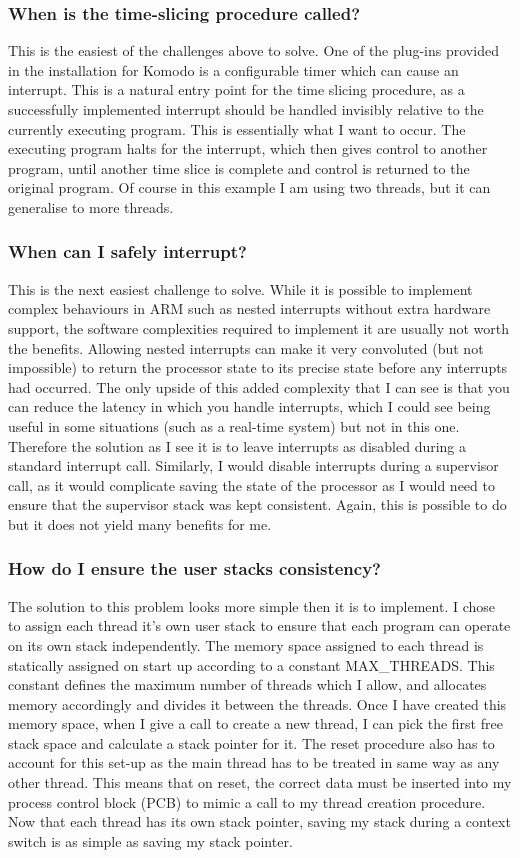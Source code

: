 \subsubsection{When is the time-slicing procedure called?}
This is the easiest of the challenges above to solve. One of the plug-ins provided in the installation for Komodo is a configurable timer which can cause an interrupt. This is a natural entry point for the time slicing procedure, as a successfully implemented interrupt should be handled invisibly relative to the currently executing program. This is essentially what I want to occur. The executing program halts for the interrupt, which then gives control to another program, until another time slice is complete and control is returned to the original program. Of course in this example I am using two threads, but it can generalise to more threads. 
\subsubsection{When can I safely interrupt?}
This is the next easiest challenge to solve. While it is possible to implement complex behaviours in ARM such as nested interrupts without extra hardware support, the software complexities required to implement it are usually not worth the benefits. Allowing nested interrupts can make it very convoluted (but not impossible) to return the processor state to its precise state before any interrupts had occurred. The only upside of this added complexity that I can see is that you can reduce the latency in which you handle interrupts, which I could see being useful in some situations (such as a real-time system) but not in this one. Therefore the solution as I see it is to leave interrupts as disabled during a standard interrupt call. Similarly, I would disable interrupts during a supervisor call, as it would complicate saving the state of the processor as I would need to ensure that the supervisor stack was kept consistent. Again, this is possible to do but it does not yield many benefits for me.
\subsubsection{How do I ensure the user stacks consistency?}
The solution to this problem looks more simple then it is to implement. I chose to assign each thread it's own user stack to ensure that each program can operate on its own stack independently. The memory space assigned to each thread is statically assigned on start up according to a constant MAX\_THREADS. This constant defines the maximum number of threads which I allow, and allocates memory accordingly and divides it between the threads.  Once I have created this memory space, when I give a call to create a new thread, I can pick the first free stack space and calculate a stack pointer for it. The reset procedure also has to account for this set-up as the main thread has to be treated in same way as any other thread.  This means that on reset, the correct data must be inserted into my process control block (PCB) to mimic a call to my thread creation procedure. Now that each thread has its own stack pointer, saving my stack during a context switch is as simple as saving my stack pointer.
\newpage
